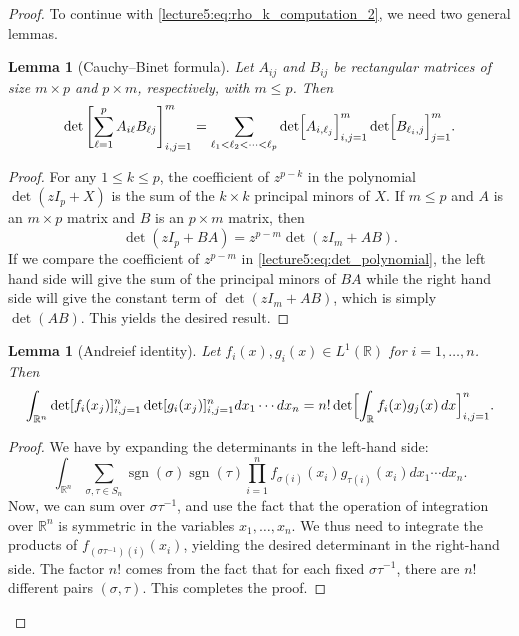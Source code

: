 \documentclass[letterpaper,11pt,oneside,reqno]{book}
\numberwithin{equation}{chapter}  %
\newtheorem{lemma}[proposition]{Lemma}
\theoremstyle{definition}
\begin{document}
\begin{proof}
To continue with \eqref{lecture5:eq:rho_k_computation_2}, we need two general lemmas.
\begin{lemma}[Cauchy--Binet formula]
	\label{lecture5:lemma:Cauchy_Binet}
	Let $A_{ij}$ and $B_{ij}$ be rectangular matrices of size \(m\times p\) and \(p\times m\), respectively,
	with
	$m\le p$.
	Then
	\begin{equation*}
		\det\left[ \sum_{\ell=1}^p A_{i\ell}B_{\ell j}
		\right]_{i,j=1}^m=
		\sum_{\ell_1<\ell_2<\cdots<\ell_p} \det\Bigl[A_{i,\ell_j}\Bigr]_{i,j=1}^m \det\Bigl[B_{\ell_i, j}\Bigr]_{j=1}^m.
	\end{equation*}
\end{lemma}
\begin{proof}
For any $1 \leq k \leq p$, the coefficient of $z^{p-k}$ in the polynomial $\det(zI_p+X)$ is the sum of the $k \times k$ principal minors of $X$. If $m \leq p$ and $A$ is an $m \times p$ matrix and $B$ is an $p \times m$ matrix, then
\begin{equation}
\label{lecture5:eq:det_polynomial}
\det(zI_p+BA)=z^{p-m}\det(zI_m+AB).
\end{equation}
If we compare the coefficient of $z^{p-m}$ in
\eqref{lecture5:eq:det_polynomial}, the left hand side will give the
sum of the principal minors of $BA$ while the right hand
side will give the constant term of $\det(zI_m+AB)$, which
is simply $\det(AB)$. This yields the desired result.
\end{proof}
\begin{lemma}[Andreief identity]
	\label{lecture5:lemma:Andreief}
	Let $f_i(x),g_i(x)\in L^1(\mathbb{R})$ for \(i=1,\ldots,n\).
	Then
	\[
	\int_{\mathbb{R}^n}
	\det[f_i(x_j)]_{i,j=1}^n
	\det[g_i(x_j)]_{i,j=1}^n
	dx_1\cdots dx_n
	=
	n! \det\Bigl[\int_{\mathbb{R}}
		f_i(x)g_j(x)\,dx
	\Bigr]_{i,j=1}^n.
	\]
\end{lemma}
\begin{proof}
	We have by expanding the determinants in the left-hand side:
	\begin{equation*}
		\int_{\mathbb{R}^n}
		\sum_{\sigma,\tau\in S_n}
		\operatorname{sgn}(\sigma)\operatorname{sgn}(\tau)
		\prod_{i=1}^n f_{\sigma(i)}(x_i)g_{\tau(i)}(x_i)
		dx_1\cdots dx_n.
	\end{equation*}
	Now, we can sum over $\sigma\tau^{-1}$, and use the fact that
	the operation of integration over $\mathbb{R}^n$
	is symmetric in the variables \(x_1,\ldots,x_n\).
	We thus need to integrate the products of $f_{(\sigma\tau^{-1})(i)}(x_i)$,
	yielding the desired determinant in the right-hand side.
	The factor $n!$ comes from the fact that for each fixed $\sigma\tau^{-1}$, there
	are $n!$ different pairs $(\sigma,\tau)$. This completes the proof.
\end{proof}


\end{proof}
\end{document}
